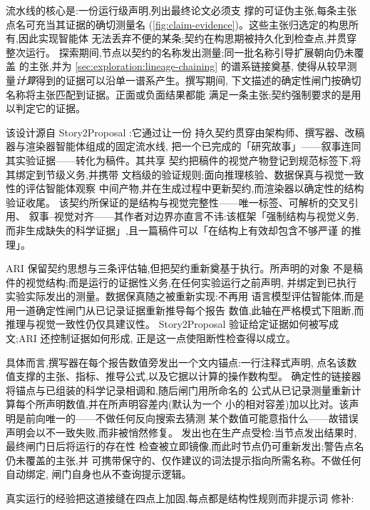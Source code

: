 流水线的核心是:一份运行级声明,列出最终论文必须支
撑的可证伪主张,每条主张点名可充当其证据的确切测量名
(\cref{fig:claim-evidence})。这些主张归选定的构思所有,因此实现智能体
无法丢弃不便的某条;契约在构思期被持久化到检查点,并贯穿整次运行。
探索期间,节点以契约的名称发出测量;同一批名称引导扩展朝向仍未覆盖
的主张,并为 \cref{sec:exploration:lineage-chaining} 的谱系链接奠基,
使得从较早测量\emph{计算}得到的证据可以沿单一谱系产生。撰写期间,
下文描述的确定性闸门按确切名称将主张匹配到证据。正面或负面结果都能
满足一条主张;契约强制要求的是用以判定它的证据。

该设计源自 Story2Proposal \cite{qian2026story2proposal}:它通过让一份
持久契约贯穿由架构师、撰写器、改稿器与渲染器智能体组成的固定流水线,
把一个已完成的「研究故事」——叙事连同其实验证据——转化为稿件。其共享
契约把稿件的视觉产物登记到规范标签下,将其绑定到节级义务,并携带
文档级的验证规则;面向推理核验、数据保真与视觉一致性的评估智能体观察
中间产物,并在生成过程中更新契约,而渲染器以确定性的结构验证收尾。
该契约所保证的是结构与视觉完整性——唯一标签、可解析的交叉引用、
叙事--视觉对齐——其作者对边界亦直言不讳:该框架「强制结构与视觉义务,
而非生成缺失的科学证据」,且一篇稿件可以「在结构上有效却包含不够严谨
的推理」\cite{qian2026story2proposal}。

ARI 保留契约思想与三条评估轴,但把契约重新奠基于执行。所声明的对象
不是稿件的视觉结构;而是运行的证据性义务,在任何实验运行之前声明,
并绑定到已执行实验实际发出的测量。数据保真随之被重新实现:不再用
语言模型评估智能体,而是用一道确定性闸门从已记录证据重新推导每个报告
数值,此轴在严格模式下阻断,而推理与视觉一致性仍仅具建议性。
Story2Proposal 验证给定证据如何被写成文;ARI 还控制证据如何形成,
正是这一点使阻断性检查得以成立。

具体而言,撰写器在每个报告数值旁发出一个文内锚点:一行注释式声明,
点名该数值支撑的主张、指标、推导公式,以及它据以计算的操作数构型。
确定性的链接器将锚点与已组装的科学记录相调和,随后闸门用所命名的
公式从已记录测量重新计算每个所声明数值,并在所声明容差内(默认为一个
小的相对容差)加以比对。该声明是前向唯一的——不做任何反向搜索去猜测
某个数值可能意指什么——故错误声明会以不一致失败,而非被悄然修复。
发出也在生产点受检:当节点发出结果时,最终闸门日后将运行的存在性
检查被立即镜像,而此时节点仍可重新发出;警告点名仍未覆盖的主张,并
可携带保守的、仅作建议的词法提示指向所需名称。不做任何自动绑定,
闸门自身也从不查询提示逻辑。

真实运行的经验把这道接缝在四点上加固,每点都是结构性规则而非提示词
修补:

